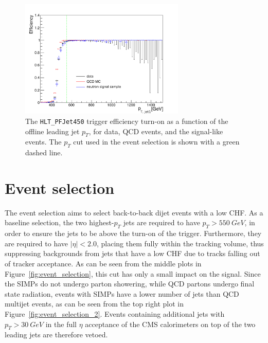 \begin{figure}[ht]
  \centering
  \includegraphics[width=0.7\textwidth]{figures/trigger/pt_HLT_PFJet450_new.pdf}
  \caption{The \texttt{HLT\_PFJet450} trigger efficiency turn-on as a function of the offline leading jet $p_T$, for data, \ac{QCD} events, and the signal-like events. The $p_T$ cut used in the event selection is shown with a green dashed line.}
  \label{fig:ptturnon}
\end{figure}

\section{Event selection}
\label{sec:SIMP_selection}

The event selection aims to select back-to-back dijet events with a low CHF. As a baseline selection, the two highest-$p_T$ jets are required to have $p_T > \SI{550}{GeV}$, in order to ensure the jets to be above the turn-on of the trigger. Furthermore, they are required to have $|\eta| < 2.0$, placing them fully within the tracking volume, thus suppressing backgrounds from jets that have a low CHF due to tracks falling out of tracker acceptance. As can be seen from the middle plots in Figure~\ref{fig:event_selection}, this cut has only a small impact on the signal. Since the \acp{SIMP} do not undergo parton showering, while \ac{QCD} partons undergo final state radiation, events with \acp{SIMP} have a lower number of jets than \ac{QCD} multijet events, as can be seen from the top right plot in Figure~\ref{fig:event_selection_2}. Events containing additional jets with $p_T>\SI{30}{GeV}$ in the full $\eta$ acceptance of the CMS calorimeters on top of the two leading jets are therefore vetoed.

